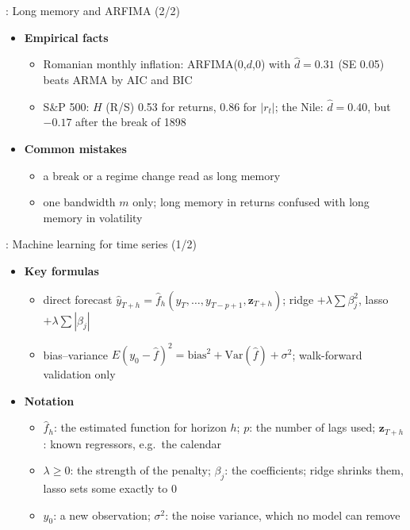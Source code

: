 \begin{frame}{: Long memory and ARFIMA (2/2)}
\itemsize{\footnotesize}
\begin{itemize}
    \item \textbf{Empirical facts}
    \begin{itemize}
        \item Romanian monthly inflation: ARFIMA(0,$d$,0) with $\hat d = 0.31$ (SE 0.05) beats ARMA by AIC and BIC
        \item S\&P 500: $H$ (R/S) 0.53 for returns, 0.86 for $|r_t|$; the Nile: $\hat d = 0.40$, but $\ensuremath{-}0.17$ after the break of 1898
    \end{itemize}
    \item \textbf{Common mistakes}
    \begin{itemize}
        \item a break or a regime change read as long memory
        \item one bandwidth $m$ only; long memory in returns confused with long memory in volatility
    \end{itemize}
\end{itemize}
\end{frame}

\begin{frame}{: Machine learning for time series (1/2)}
\itemsize{\footnotesize}
\begin{itemize}
    \item \textbf{Key formulas}
    \begin{itemize}
        \item direct forecast $\hat y_{T+h} = \hat f_h(y_T, \dots, y_{T-p+1}, \mathbf z_{T+h})$; ridge $+\lambda\sum\beta_j^2$, lasso $+\lambda\sum|\beta_j|$
        \item bias--variance $E(y_0 - \hat f)^2 = \text{bias}^2 + \mathrm{Var}(\hat f) + \sigma^2$; walk-forward validation only
    \end{itemize}
    \item \textbf{Notation}
    \begin{itemize}
        \item $\hat f_h$: the estimated function for horizon $h$; $p$: the number of lags used; $\mathbf z_{T+h}$: known regressors, e.g.\ the calendar
        \item $\lambda \ge 0$: the strength of the penalty; $\beta_j$: the coefficients; ridge shrinks them, lasso sets some exactly to 0
        \item $y_0$: a new observation; $\sigma^2$: the noise variance, which no model can remove
    \end{itemize}
\end{itemize}
\end{frame}

